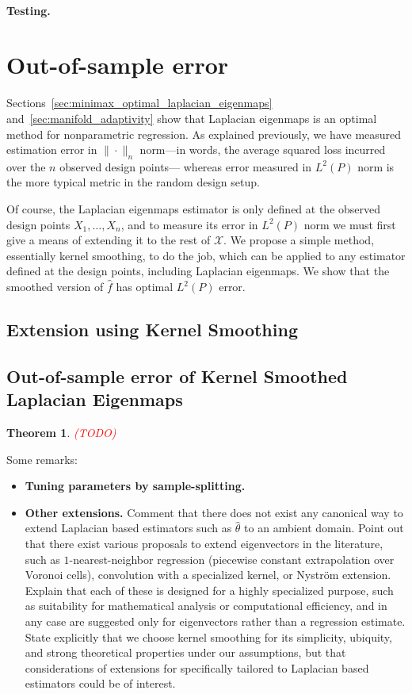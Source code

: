 \documentclass{article}
\newcommand{\1}{\mathbf{1}}
\newcommand{\Xset}{\mathcal{X}}
\newcommand{\wh}[1]{\widehat{#1}}
\theoremstyle{alden}
\theoremstyle{aldenthm}
\newtheorem{theorem}{Theorem}
\theoremstyle{definition}
\theoremstyle{remark}
\begin{document}
\paragraph{Testing.}

\section{Out-of-sample error}
\label{sec:out_of_sample}
Sections~\ref{sec:minimax_optimal_laplacian_eigenmaps} and~\ref{sec:manifold_adaptivity} show that Laplacian eigenmaps is an optimal method for nonparametric regression. As explained previously, we have measured estimation error in $\|\cdot\|_n$ norm---in words, the average squared loss incurred over the $n$ observed design points--- whereas error measured in $L^2(P)$ norm is the more typical metric in the random design setup.

Of course, the Laplacian eigenmaps estimator is only defined at the observed design points $X_1,\ldots,X_n$, and to measure its error in $L^2(P)$ norm we must first give a means of extending it to the rest of $\Xset$. We propose a simple method, essentially kernel smoothing, to do the job, which can be applied to any estimator defined at the design points, including Laplacian eigenmaps. We show that the smoothed version of $\wh{f}$ has optimal $L^2(P)$ error. 

\subsection{Extension using Kernel Smoothing}

\subsection{Out-of-sample error of Kernel Smoothed Laplacian Eigenmaps}

\begin{theorem}
	\label{thm:kernel_smoothing}
	\textcolor{red}{(TODO)}
\end{theorem}

Some remarks:
\begin{itemize}
	\item \textbf{Tuning parameters by sample-splitting.}
	\item \textbf{Other extensions.} Comment that there does not exist any canonical way to extend Laplacian based estimators such as $\wh{\theta}$ to an ambient domain. Point out that there exist various proposals to extend eigenvectors in the literature, such as $1$-nearest-neighbor regression (piecewise constant extrapolation over Voronoi cells), convolution with a specialized kernel, or Nystr\"{o}m extension. Explain that each of these is designed for a highly specialized purpose, such as suitability for mathematical analysis or computational efficiency, and in any case are suggested only for eigenvectors rather than a regression estimate. State explicitly that we choose kernel smoothing for its simplicity, ubiquity, and strong theoretical properties under our assumptions, but that considerations of extensions for specifically tailored to Laplacian based estimators could be of interest.
\end{itemize}
\end{document}
